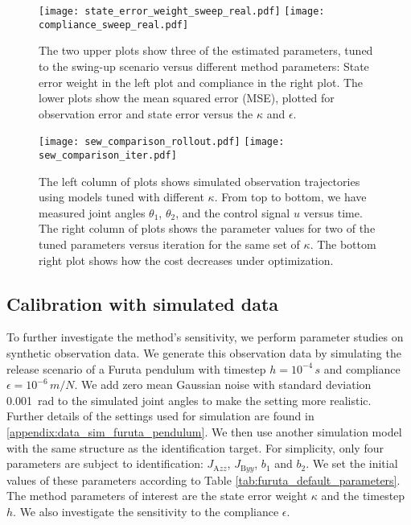 \documentclass[preprint,12pt]{elsarticle}
\numberwithin{equation}{section}
\def\tA{\text{A}}
\def\tB{\text{B}}
\def\stateweight{\kappa}
\begin{document}
\begin{figure}
    \centering
    \texttt{[image: state\_error\_weight\_sweep\_real.pdf]}
    \texttt{[image: compliance\_sweep\_real.pdf]}
    \caption{
        The two upper plots show three of the estimated parameters, tuned to the swing-up scenario versus different method parameters:
        State error weight in the left plot and compliance in the right plot.
        The lower plots show the mean squared error (MSE), plotted for observation error and state error versus the $\stateweight$ and $\epsilon$.
    }
    \label{fig:state_error_weight_sweep_real}
\end{figure}
\begin{figure}
    \centering
    \texttt{[image: sew\_comparison\_rollout.pdf]}
    \texttt{[image: sew\_comparison\_iter.pdf]}
    \caption{
        The left column of plots shows simulated observation trajectories using models tuned with different $\kappa$.
        From top to bottom, we have measured joint angles $\theta_1$, $\theta_2$, and the control signal $u$ versus time.
        The right column of plots shows the parameter values for two of the tuned parameters versus iteration for the same set of $\kappa$.
        The bottom right plot shows how the cost decreases under optimization.
    }
    \label{fig:furuta_rollout_weight_sweep}
\end{figure}
\subsection{Calibration with simulated data}
To further investigate the method's sensitivity, we perform parameter studies on synthetic observation data.
We generate this observation data by simulating the release scenario of a Furuta pendulum with timestep $h = 10^{-4}\,\si{s}$ and compliance $\epsilon = 10^{-6}\,\si{m/N}$.
We add zero mean Gaussian noise with standard deviation \SI{0.001}{rad} to the simulated joint angles to make the setting more realistic.
Further details of the settings used for simulation are found in \ref{appendix:data_sim_furuta_pendulum}.
We then use another simulation model with the same structure as the identification target.
For simplicity, only four parameters are subject to identification: $J_{\tA zz}$, $J_{\tB yy}$, $b_1$ and $b_2$.
We set the initial values of these parameters according to Table \ref{tab:furuta_default_parameters}.
The method parameters of interest are the state error weight $\stateweight$ and the timestep $h$.
We also investigate the sensitivity to the compliance $\epsilon$.
\end{document}
